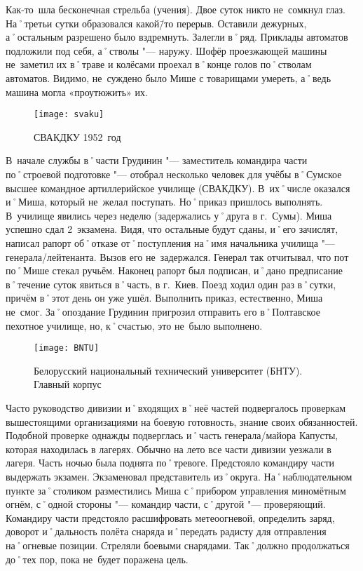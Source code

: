 Как-то~шла бесконечная стрельба (учения). Двое суток никто не~сомкнул глаз. На˚третьи сутки образовался какой\=/то перерыв. Оставили дежурных, а˚остальным разрешено было вздремнуть. Залегли в˚ряд. Приклады автоматов подложили под себя, а˚стволы "---  наружу. Шофёр проезжающей машины не~заметил их в˚траве и колёсами проехал в˚конце голов по˚стволам автоматов. Видимо, не~суждено было Мише с товарищами умереть, а˚ведь машина могла «проутюжить» их.

\begin{wrapfigure}{O}{.4\textwidth}
\centering
\texttt{[image: svaku]}
\caption[СВАКДКУ 1952~год]{СВАКДКУ 1952~год\footnotemark}
\label{fig:svaku}
\end{wrapfigure}

В~начале службы в˚части Грудинин "--- заместитель командира части по˚строевой подготовке "--- отобрал несколько человек для учёбы в˚Сумское высшее командное артиллерийское училище (СВАКДКУ). В~их˚числе оказался и˚Миша, который не~желал поступать. Но˚приказ пришлось выполнять. В~училище явились через неделю (задержались у˚друга в г.~Сумы). Миша успешно сдал 2~экзамена. Видя, что остальные будут сданы, и˚его зачислят, написал рапорт об˚отказе от˚поступления на˚имя начальника училища "--- генерала\-/лейтенанта. Вызов его не~задержался. Генерал так отчитывал, что пот по˚Мише стекал ручьём. Наконец рапорт был подписан, и˚дано предписание в˚течение суток явиться в˚часть, в г.~Киев. Поезд ходил один раз в˚сутки, причём в˚этот день он уже ушёл. Выполнить приказ, естественно, Миша не~смог. За˚опоздание Грудинин пригрозил отправить его в˚Полтавское пехотное училище, но, к˚счастью, это не~было выполнено.  

\begin{wrapfigure}{O}{.4\textwidth}
\centering
\texttt{[image: BNTU]}
\caption[Белорусский национальный технический университет (БНТУ). Главный корпус]{Белорусский национальный технический университет (БНТУ). Главный корпус\footnotemark}
\label{fig:BNTU}
\end{wrapfigure}

Часто руководство дивизии и˚входящих в˚неё частей подвергалось проверкам вышестоящими организациями на боевую готовность, знание своих обязанностей. Подобной проверке однажды подверглась и˚часть генерала\-/майора Капусты, которая находилась в лагерях. Обычно на лето все части дивизии уезжали в лагеря. Часть ночью была поднята по˚тревоге. Предстояло командиру части выдержать экзамен. Экзаменовал представитель из˚округа. На˚наблюдательном пункте за˚столиком разместились Миша с˚прибором управления миномётным огнём, с˚одной стороны "--- командир части, с˚другой "--- проверяющий. Командиру части предстояло расшифровать метеоогневой, определить заряд, доворот и˚дальность полёта снаряда и˚передать радисту для отправления на˚огневые позиции. Стреляли боевыми снарядами. Так˚должно продолжаться до˚тех пор, пока не~будет поражена цель.


